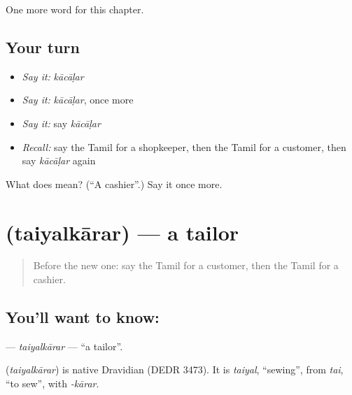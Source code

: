 \begin{grammarlens}[title={What you've built}]
One more word for this chapter.
\end{grammarlens}

\subsection*{Your turn}
\begin{itemize}
\raggedright
  \item \emph{Say it:} \emph{kācāḷar}
  \item \emph{Say it:} \emph{kācāḷar}, once more
  \item \emph{Say it:} say \emph{kācāḷar}
  \item \emph{Recall:} say the Tamil for a shopkeeper, then the Tamil for a customer, then say \emph{kācāḷar} again
\end{itemize}

\begin{tcolorbox}[breakable,colback=teal!4,colframe=teal!35!black,title={Before you move on}]
What does  mean? (\textquotedblleft{}A cashier\textquotedblright{}.) Say it once more.
\end{tcolorbox}
\section[\texorpdfstring{\ta{தையல்காரர்} (taiyalkārar)}{தையல்காரர் (taiyalkārar)}]{ (taiyalkārar) — a tailor}

\label{lesson:TA-C191-taiyalkarar}



\begin{quote}
Before the new one: say the Tamil for a customer, then the Tamil for a cashier.
\end{quote}

\subsection*{You'll want to know: }
\textbf{} — \emph{taiyalkārar} — \textquotedblleft{}a tailor\textquotedblright{}.

\begin{cousinweb}
\textbf{} (\emph{taiyalkārar}) is native Dravidian (DEDR 3473). It is \emph{taiyal}, \textquotedblleft{}sewing\textquotedblright{}, from \emph{tai}, \textquotedblleft{}to sew\textquotedblright{}, with \emph{-kārar}.
\end{cousinweb}

